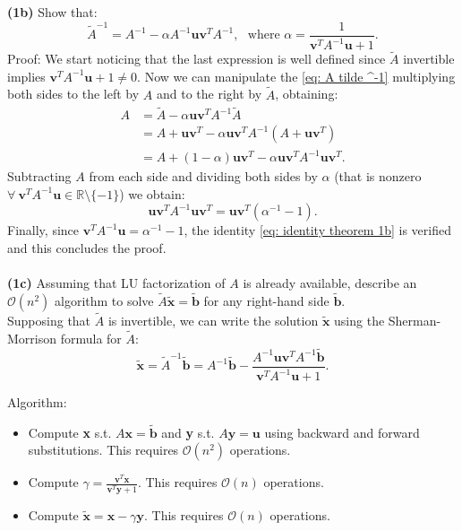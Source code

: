 \documentclass[a4paper,11pt]{article}
\newcommand{\R}{\mathbb{R}}
\begin{document}
\noindent \textbf{(1b)} Show that:
\begin{equation}\label{eq: A tilde ^-1}
	\tilde{A}^{-1} = A^{-1}  - \alpha A^{-1} \textbf{u}\textbf{v}^T A^{-1},\ \ \ \text{where } \alpha = \frac{1}{\textbf{v}^T A^{-1}\textbf{u} + 1}.
\end{equation}
Proof: We start noticing that the last expression is well defined since $\tilde{A}$ invertible implies $\textbf{v}^T A^{-1} \textbf{u} + 1 \neq 0$. Now we can manipulate the \eqref{eq: A tilde ^-1} multiplying both sides to the left by $A$ and to the right by $\tilde{A}$, obtaining:
\begin{equation}\label{key}
	\begin{split}
		A &= \tilde{A} - \alpha \textbf{u} \textbf{v}^T A^{-1} \tilde{A} \\
		&= A + \textbf{u}\textbf{v}^T - \alpha \textbf{u} \textbf{v}^T A^{-1} (A + \textbf{u}\textbf{v}^T )\\
		&= A + (1-\alpha) \textbf{u}\textbf{v}^T - \alpha \textbf{u}\textbf{v}^TA^{-1} \textbf{u}\textbf{v}^T.
	\end{split}
\end{equation}
Subtracting $A$ from each side and dividing both sides by $\alpha$ (that is nonzero $\forall \ \textbf{v}^T A^{-1}\textbf{u} \in \R \setminus \{-1\}$) we obtain:
\begin{equation}\label{eq: identity theorem 1b}
	\textbf{u}\textbf{v}^T A^{-1} \textbf{u}\textbf{v}^T = \textbf{u}\textbf{v}^T(\alpha^{-1}-1).
\end{equation}
Finally, since $\textbf{v}^T A^{-1} \textbf{u} = \alpha^{-1} - 1$, the identity \eqref{eq: identity theorem 1b} is verified and this concludes the proof.\\
\\
\textbf{(1c)} Assuming that LU factorization of $A$ is already available, describe an $\mathcal{O}(n^2)$ algorithm to solve $\tilde{A} \tilde{\textbf{x}} = \tilde{\textbf{b}}$ for any right-hand side $\tilde{\textbf{b}}$.\\
Supposing that $\tilde{A}$ is invertible, we can write the solution $\tilde{\textbf{x}}$ using the Sherman-Morrison formula for $\tilde{A}$:
\begin{equation}\label{key}
	\tilde{\textbf{x}} = \tilde{A}^{-1} \tilde{\textbf{b}} =  A^{-1} \tilde{\textbf{b}}  - \frac{A^{-1}\textbf{u}\textbf{v}^T A^{-1}\tilde{\textbf{b}} }{\textbf{v}^T A^{-1} \textbf{u} + 1 }.
\end{equation}

\noindent Algorithm: 
\begin{itemize}
	\item Compute \textbf{x} s.t. $A\textbf{x} = \tilde{\textbf{b}}$ and \textbf{y} s.t. $A\textbf{y} = \textbf{u}$ using backward and forward substitutions. This requires $\mathcal{O}(n^2)$ operations.
	\item Compute $\gamma = \frac{\textbf{v}^T \textbf{x}}{\textbf{v}^T \textbf{y} + 1}$. This requires $\mathcal{O}(n)$ operations.
	\item Compute $\tilde{\textbf{x}} = \textbf{x} - \gamma \textbf{y}$. This requires $\mathcal{O}(n)$ operations.
\end{itemize}
\end{document}
